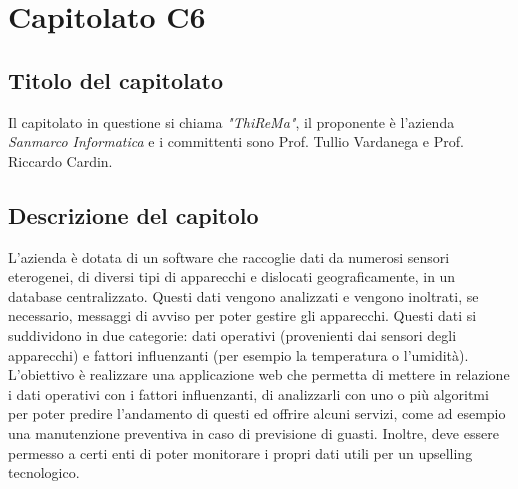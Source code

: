 \section{Capitolato C6}
\subsection{Titolo del capitolato}
Il capitolato in questione si chiama \textit{"ThiReMa"}, il proponente \`e l'azienda \textit{Sanmarco Informatica} e i committenti sono Prof. Tullio Vardanega e Prof. Riccardo Cardin.

\subsection{Descrizione del capitolo}
L'azienda \`e dotata di un software che raccoglie dati da numerosi sensori eterogenei, di diversi tipi di apparecchi e dislocati geograficamente, in un database centralizzato. Questi dati vengono analizzati e vengono inoltrati, se necessario, messaggi di avviso per poter gestire gli apparecchi. Questi dati si suddividono in due categorie: dati operativi (provenienti dai sensori degli apparecchi) e fattori influenzanti (per esempio la temperatura o l'umidit\`a).
L'obiettivo \`e realizzare una applicazione web che permetta di mettere in relazione i dati operativi con i fattori influenzanti, di analizzarli con uno o pi\`u algoritmi per poter predire l'andamento di questi ed offrire alcuni servizi, come ad esempio una manutenzione preventiva in caso di previsione di guasti. Inoltre, deve essere permesso a certi enti di poter monitorare i propri dati utili per un upselling tecnologico.


